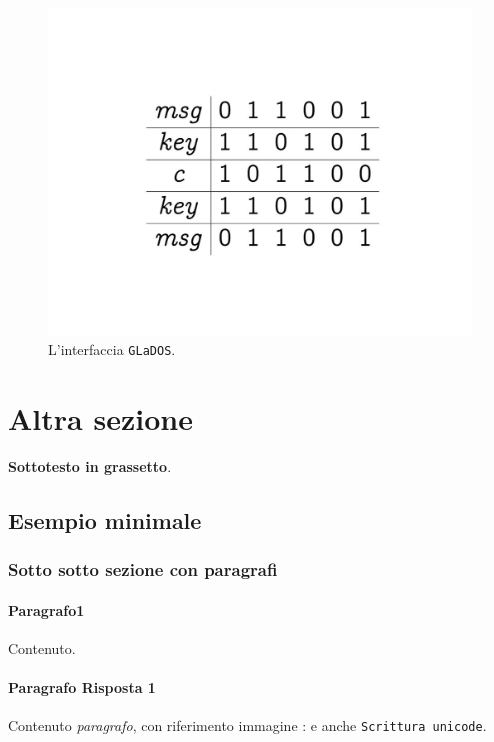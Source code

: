 \documentclass[a4paper,12pt]{report}
\begin{document}
\begin{figure}[h]
\centering{}
\includegraphics[width=\textwidth]{img/example_img.pdf}
\caption{L'interfaccia \texttt{GLaDOS}.}
\label{img:example}
\end{figure}

\section{Altra sezione}

\textbf{Sottotesto in grassetto}.

\subsection*{Esempio minimale}

\subsubsection{Sotto sotto sezione con paragrafi}

\paragraph{Paragrafo1} Contenuto.

\paragraph{Paragrafo Risposta 1} Contenuto \textit{paragrafo}, con riferimento immagine
: e anche \texttt{Scrittura unicode}.
\end{document}
